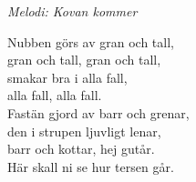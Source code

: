 {\footnotesize\textit{Melodi: Kovan kommer}}\par
\vspace{10pt}
Nubben görs av gran och tall,\\
gran och tall, gran och tall,\\
smakar bra i alla fall,\\
alla fall, alla fall. \\
Fastän gjord av barr och grenar,\\
den i strupen ljuvligt lenar,\\
barr och kottar, hej gutår. \\
Här skall ni se hur tersen går.
